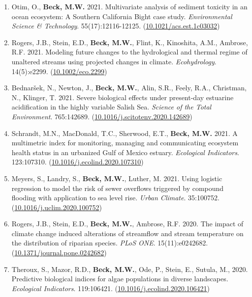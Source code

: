 \documentclass[letterpaper,12pt]{article}
\begin{document}
\begin{enumerate}
\item Otim, O., \textbf{Beck, M.W.} 2021. Multivariate analysis of sediment toxicity in an ocean ecosystem: A Southern California Bight case study. \textit{Environmental Science \& Technology}. 55(17):12116-12125. ({\footnotesize\href{https://doi.org/10.1021/acs.est.1c03032}{10.1021/acs.est.1c03032}})

\item Rogers, J.B., Stein, E.D., \textbf{Beck, M.W.}, Flint, K., Kinoshita, A.M., Ambrose, R.F. 2021. Modeling future changes to the hydrological and thermal regime of unaltered streams using projected changes in climate. \textit{Ecohydrology}. 14(5):e2299. ({\footnotesize\href{https://doi.org/10.1002/eco.2299}{10.1002/eco.2299}})

\item Bednar\v{s}ek, N., Newton, J., \textbf{Beck, M.W.}, Alin, S.R., Feely, R.A., Christman, N., Klinger, T. 2021. Severe biological effects under present-day estuarine acidification in the highly variable {S}alish {S}ea. \textit{Science of the Total Environment}. 765:142689. ({\footnotesize\href{https://doi.org/10.1016/j.scitotenv.2020.142689}{10.1016/j.scitotenv.2020.142689}})

\item Schrandt, M.N., MacDonald, T.C., Sherwood, E.T., \textbf{Beck, M.W.} 2021. A multimetric index for monitoring, managing and communicating ecosystem health status in an urbanized Gulf of Mexico estuary. \textit{Ecological Indicators}. 123:107310. ({\footnotesize\href{https://doi.org/10.1016/j.ecolind.2020.107310}{10.1016/j.ecolind.2020.107310}})

\item Meyers, S., Landry, S., \textbf{Beck, M.W.}, Luther, M. 2021. Using logistic regression to model the risk of sewer overflows triggered by compound flooding with application to sea level rise. \textit{Urban Climate}. 35:100752. ({\footnotesize\href{https://doi.org/10.1016/j.uclim.2020.100752}{10.1016/j.uclim.2020.100752}})

\item Rogers, J.B., Stein, E.D., \textbf{Beck, M.W.}, Ambrose, R.F. 2020. The impact of climate change induced alterations of streamflow and stream temperature on the distribution of riparian species. \textit{PLoS ONE}. 15(11):e0242682. ({\footnotesize\href{https://doi.org/10.1371/journal.pone.0242682}{10.1371/journal.pone.0242682}})

\item Theroux, S., Mazor, R.D., \textbf{Beck, M.W.}, Ode, P., Stein, E., Sutula, M., 2020. Predictive biological indices for algae populations in diverse landscapes. \textit{Ecological Indicators}. 119:106421. ({\footnotesize\href{https://doi.org/10.1016/j.ecolind.2020.106421}{10.1016/j.ecolind.2020.106421}})


\end{enumerate}
\end{document}
